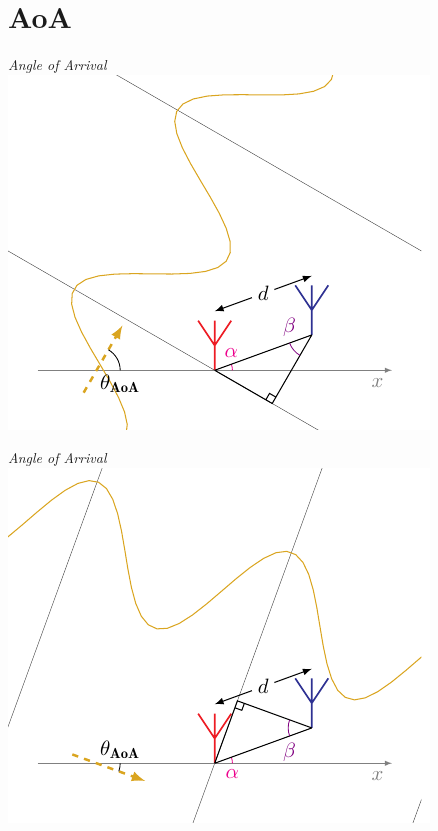 \section{AoA}

    \begin{frame}{\textit{Angle of Arrival}}
        \centering\includegraphics{../pictures/AoA_1_new}
    \end{frame}

    \begin{frame}{\textit{Angle of Arrival}}
        \centering\includegraphics{../pictures/AoA_2_new}
    \end{frame}

